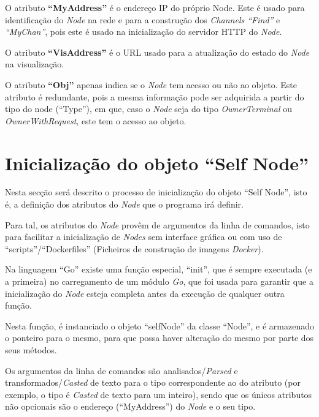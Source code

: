 O atributo \textbf{``MyAddress''} é o endereço \acs{IP} do próprio Node. 
Este é usado para identificação do \emph{Node} na rede e para a construção dos \emph{Channels ``Find''} e \emph{``MyChan''},
pois este é usado na inicialização do servidor \acs{HTTP} do \emph{Node}.

O atributo \textbf{``VisAddress''} é o \acs{URL} usado para a atualização do estado do \emph{Node} na visualização.

O atributo \textbf{``Obj''} apenas indica se o \emph{Node} tem acesso ou não ao objeto.
Este atributo é redundante, pois a mesma informação pode ser adquirida a partir do tipo do node (``Type''), 
em que, caso o \emph{Node} seja do tipo \emph{OwnerTerminal} ou \emph{OwnerWithRequest}, este tem o acesso ao objeto.


\section{Inicialização do objeto ``Self Node''}

Nesta secção será descrito o processo de inicialização do objeto ``Self Node'', 
isto é, a definição dos atributos do \emph{Node} que o programa irá definir.

Para tal, os atributos do \emph{Node} provêm de argumentos da linha de comandos, isto para facilitar
a inicialização de \emph{Nodes} sem interface gráfica ou com uso de ``scripts''/``Dockerfiles'' (Ficheiros de construção de imagens \emph{Docker}).

Na linguagem ``Go'' existe uma função especial, ``init'', que é sempre executada (e a primeira) no carregamento de um módulo \emph{Go},
que foi usada para garantir que a inicialização do \emph{Node} esteja completa antes da execução de qualquer outra função.



Nesta função, é instanciado o objeto ``selfNode'' da classe ``Node'', e é armazenado o ponteiro para o mesmo, para que possa haver alteração do mesmo
por parte dos seus métodos.

Os argumentos da linha de comandos são analisados/\emph{Parsed} e transformados/\emph{Casted} de texto para o tipo
correspondente ao do atributo (por exemplo, o tipo é \emph{Casted} de texto para um inteiro), sendo que 
os únicos atributos não opcionais são o endereço (``MyAddress'') do \emph{Node} e o seu tipo.


